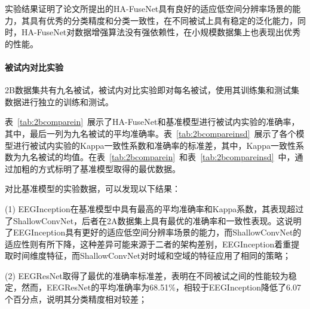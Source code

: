 实验结果证明了论文所提出的HA-FuseNet具有良好的适应低空间分辨率场景的能力，其具有优秀的分类精度和分类一致性，在不同被试上具有稳定的泛化能力，同时，HA-FuseNet对数据增强算法没有强依赖性，在小规模数据集上也表现出优秀的性能。

\paragraph{被试内对比实验}

2B数据集共有九名被试，被试内对比实验即对每名被试，使用其训练集和测试集数据进行独立的训练和测试。

表~\ref{tab:2bcomparein}~展示了HA-FuseNet和基准模型进行被试内实验的准确率，其中，最后一列为九名被试的平均准确率。表~\ref{tab:2bcompareinsd}~展示了各个模型进行被试内实验的Kappa一致性系数和准确率的标准差，其中，Kappa一致性系数为九名被试的均值。在表~\ref{tab:2bcomparein}~和表~\ref{tab:2bcompareinsd}~中，通过加粗的方式标明了基准模型取得的最优数据。

对比基准模型的实验数据，可以发现以下结果：

(1) EEGInception在基准模型中具有最高的平均准确率和Kappa系数，其表现超过了ShallowConvNet，后者在2A数据集上具有最优的准确率和一致性表现。这说明了EEGInception具有更好的适应低空间分辨率场景的能力，而ShallowConvNet的适应性则有所下降，这种差异可能来源于二者的架构差别，EEGInception着重提取时间维度特征，而ShallowConvNet对时域和空域的特征应用了相同的策略；

(2) EEGResNet取得了最优的准确率标准差，表明在不同被试之间的性能较为稳定，然而，EEGResNet的平均准确率为68.51\%，相较于EEGInception降低了6.07个百分点，说明其分类精度相对较差；

